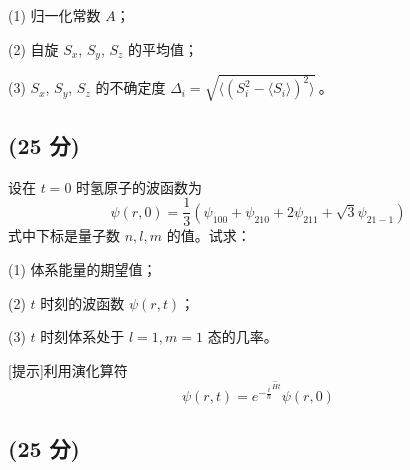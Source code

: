 (1) 归一化常数 \( A \)；

(2) 自旋 \( S_x \), \( S_y \), \( S_z \) 的平均值；

(3) \( S_x \), \( S_y \), \( S_z \) 的不确定度 \(\Delta_i = \sqrt{\langle (S_i^2  - \langle S_i \rangle)^2\rangle}~\)。

\subsection{(25 分)}
设在 \( t=0 \) 时氢原子的波函数为
\[\psi(r, 0) = \frac{1}{3} \left( \psi_{100} + \psi_{210} + 2 \psi_{211} + \sqrt{3} \psi_{21-1} \right)~\]
式中下标是量子数 \( n, l, m \) 的值。试求：

(1) 体系能量的期望值；

(2) \( t \) 时刻的波函数 \( \psi(r,t) \)；

(3) \( t \) 时刻体系处于 \( l=1, m=1 \) 态的几率。

[提示]利用演化算符
\[\psi(r,t) = e^{-\frac{i }{\hbar}^{\hat{H}t}} \psi(r,0)~\]
\subsection{(25 分)}